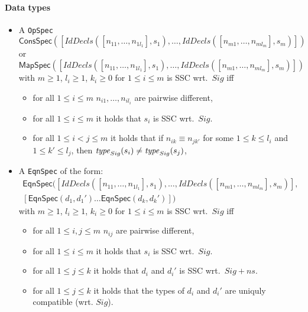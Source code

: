 \documentclass[fleqn,a4paper,dvips]{article}
\newcommand{\aterm}[1]{\mathsf{#1}}
\begin{document}
\paragraph{Data types}
\begin{itemize}
\item
  A {\tt OpSpec}\\
  $\aterm{ConsSpec}([IdDecls([n_{11},\dots,n_{1l_1}],s_1),\dots,IdDecls([n_{m1},\dots,n_{ml_m}],s_m)])$ 
  or\\
  $\aterm{MapSpec}([IdDecls([n_{11},\dots,n_{1l_1}],s_1),\dots,IdDecls([n_{m1},\dots,n_{ml_m}],s_m)])$ 
  with $m\geq 1$, $l_i\geq 1$, $k_i\geq 0$ for $1\leq i\leq m$
  is SSC wrt.\ $Sig$ iff 
  \begin{itemize}
  \item
    for all $1\leq i\leq m$  $n_{i1},\ldots,n_{il_i}$ are
    pairwise different,
  \item
    for all $1\leq i\leq m$ it holds that $s_i$ is SSC wrt.\ $Sig$.
  \item
    for all $1\leq i<j\leq m$ it holds that
    if $n_{ik}\equiv n_{jk'}$ for some $1\leq k\leq l_i$ and $1\leq
    k'\leq l_j$, then $\mathit{type}_{Sig}(s_i)\neq\mathit{type}_{Sig}(s_j)$,
  \end{itemize}
\item
  A {\tt EqnSpec} of the form:\\
\begin{gather}
  \aterm{EqnSpec}([IdDecls([n_{11},\ldots,n_{1l_1}],s_1),\dots,IdDecls([n_{m1},\ldots,n_{ml_m}],s_m)],\\
  [\aterm{EqnSpec}(d_1,d_1')\dots\aterm{EqnSpec}(d_k,d_k')])
\end{gather}
  with $m\geq 1$, $l_i\geq 1$, $k_i\geq 0$ for $1\leq i\leq m$
  is SSC wrt.\ $Sig$ iff 
  \begin{itemize}
  \item
    for all $1\leq i,j\leq m$  $n_{ij}$ are pairwise different,
  \item
    for all $1\leq i\leq m$ it holds that $s_i$ is SSC wrt.\ $Sig$.
  \item
    for all $1\leq j\leq k$ it holds that $d_i$ and $d_i'$ is SSC wrt.\ $Sig+ns$.
  \item
    for all $1\leq j\leq k$ it holds that the types of $d_i$ and $d_i'$ are uniquly compatible (wrt. $Sig$).
  \end{itemize}
\end{itemize}
\end{document}
